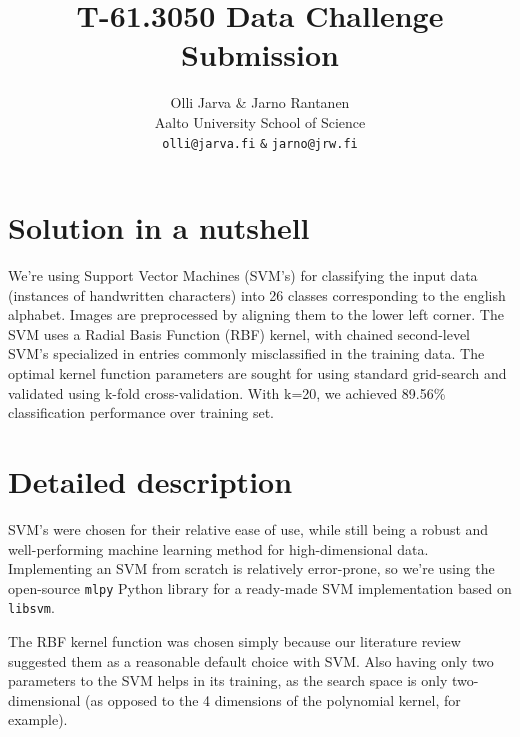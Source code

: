 \documentclass{netsec2012}
\begin{document}

\title{T-61.3050 Data Challenge Submission}

\author{Olli Jarva \& Jarno Rantanen \\
        Aalto University School of Science \\
	\texttt{olli@jarva.fi} \texttt{\&} \texttt{jarno@jrw.fi}}
\maketitle


\section{Solution in a nutshell}

We're using Support Vector Machines (SVM's) for classifying the input data (instances of 
handwritten characters) into 26 classes corresponding to the english alphabet. Images are 
preprocessed by aligning them to the lower left corner. The SVM uses a Radial Basis Function 
(RBF) kernel, with chained second-level SVM's specialized in entries commonly misclassified in 
the training data. The optimal kernel function parameters are sought for using standard 
grid-search and validated using k-fold cross-validation. With k=20, we achieved 89.56\% 
classification performance over training set.

\section{Detailed description}

SVM's were chosen for their relative ease of use, while still being a robust and well-performing 
machine learning method for high-dimensional data.  Implementing an SVM from scratch is 
relatively error-prone, so we're using the open-source \texttt{mlpy} Python library for a 
ready-made SVM implementation based on \texttt{libsvm}.


The RBF kernel function was chosen simply because our literature review suggested them as a reasonable
default choice with SVM.  Also having only two parameters to the SVM helps in its training,
as the search space is only two-dimensional (as opposed to the 4 dimensions of the polynomial kernel,
for example).
\end{document}
